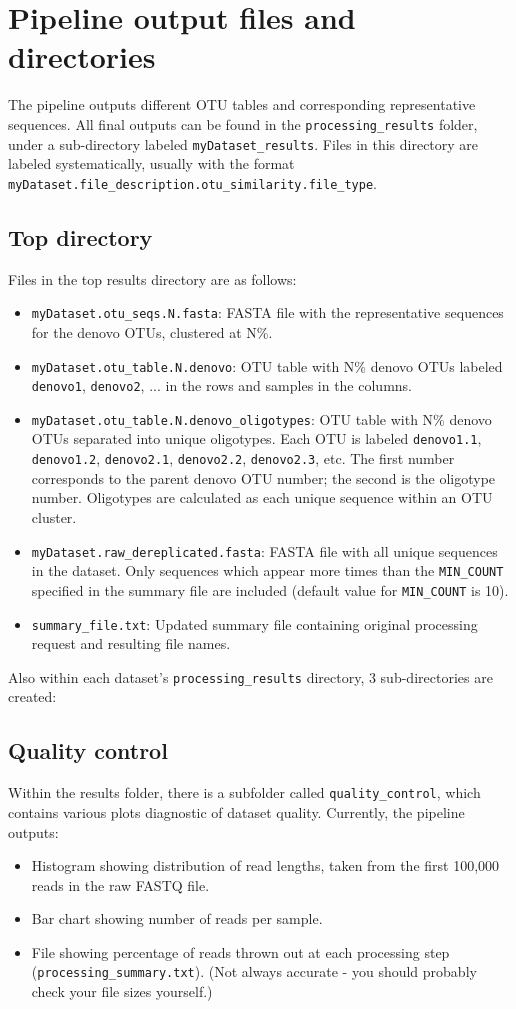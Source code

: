 \documentclass[11pt, oneside]{article}   	%
\begin{document}
\section{Pipeline output files and directories}
The pipeline outputs different OTU tables and corresponding representative sequences. All final outputs can be found in the {\tt processing\_results} folder, under a sub-directory labeled {\tt myDataset\_results}. Files in this directory are labeled systematically, usually with the format {\tt myDataset.file\_description.otu\_similarity.file\_type}. 

\subsection{Top directory}
Files in the top results directory are as follows:
\begin{itemize}
	\item {\tt myDataset.otu\_seqs.N.fasta}: FASTA file with the representative sequences for the denovo OTUs, clustered at N\%.
	\item {\tt myDataset.otu\_table.N.denovo}: OTU table with N\% denovo OTUs labeled 
		{\tt denovo1}, {\tt denovo2}, ... in the rows and samples in the columns.
	\item {\tt myDataset.otu\_table.N.denovo\_oligotypes}: OTU table with N\% denovo 
		OTUs separated into unique oligotypes. Each OTU is labeled {\tt denovo1.1}, 
		{\tt denovo1.2}, {\tt denovo2.1}, {\tt denovo2.2}, {\tt denovo2.3}, etc. 
		The first number corresponds to the parent denovo OTU number; the second 
		is the oligotype number. Oligotypes are calculated as each unique sequence 
		within an OTU cluster.
	\item {\tt myDataset.raw\_dereplicated.fasta}: FASTA file with all unique 
		sequences in the dataset. Only sequences which appear more times than the {\tt MIN\_COUNT} 
		specified in the summary file are included (default value for {\tt MIN\_COUNT} is 10).
	\item {\tt summary\_file.txt}: Updated summary file containing original processing request and resulting file names.
\end{itemize}

Also within each dataset's {\tt processing\_results} directory, 3 sub-directories are created:

\subsection{Quality control}
Within the results folder, there is a subfolder called {\tt quality\_control}, which contains various plots diagnostic of dataset quality.  Currently, the pipeline outputs:
\begin{itemize}
	\item Histogram showing distribution of read lengths, taken from the first 100,000 reads in the raw FASTQ file.
	\item Bar chart showing number of reads per sample.
	\item File showing percentage of reads thrown out at each processing step 
	({\tt processing\_summary.txt}). (Not always accurate - you
	should probably check your file sizes yourself.)
\end{itemize}
\end{document}
